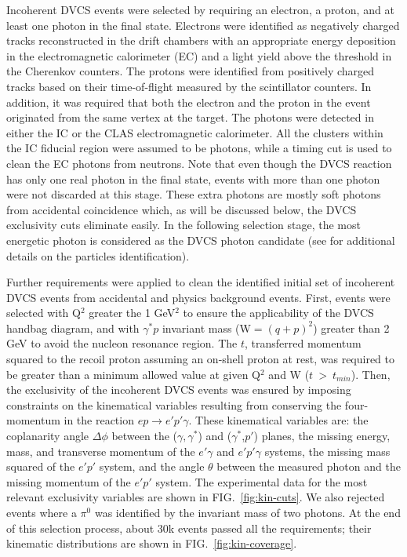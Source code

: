 \documentclass[twocolumn,nofootinbib,showpacs,prl,superscriptaddress,secnumarabic,amssymb,nobibnotes,aps,floatfix]{revtex4}
\begin{document}
Incoherent DVCS events were selected by requiring an electron, a proton, and at 
least one photon in the final state. Electrons were identified as negatively 
charged tracks reconstructed in the drift chambers with an appropriate energy 
deposition in the electromagnetic calorimeter (EC) and a light yield above the 
threshold in the Cherenkov counters. The protons were identified from 
positively charged tracks based on their time-of-flight measured 
by the scintillator counters.  In addition, it was required that both the 
electron and the proton in the event originated from the same vertex at the 
target. The photons were detected in 
either the IC or the CLAS electromagnetic calorimeter. All the clusters within 
the IC fiducial region were assumed to be photons, while a timing cut is used 
to clean the EC photons from neutrons. Note that even though the DVCS reaction 
has only one real photon in the final state, events with more than one photon 
were not discarded at this stage. These extra photons are mostly soft photons from accidental 
coincidence which, as will be discussed below, the DVCS exclusivity cuts 
eliminate easily. In the following selection stage, the most energetic photon 
is considered as the DVCS photon candidate (see \cite{Hattawy:thesis} for 
additional details on the particles identification).  

Further requirements were applied to clean the identified initial set of 
incoherent DVCS events from accidental and physics background events. First, 
events were selected with Q$^{2}$ greater the 1 GeV$^2$ to ensure the 
applicability of the DVCS handbag diagram, and with $\gamma^{*}p$ invariant 
mass (W$=(q+p)^2$) greater than 2 GeV to avoid the nucleon resonance region.  
The $t$, transferred momentum squared to the recoil proton assuming an 
on-shell proton at rest, was required to be greater than a minimum allowed 
value at given Q$^2$ and W ($t~>~t_{min}$).  Then, the exclusivity of the 
incoherent DVCS events was ensured by imposing constraints on the kinematical 
variables resulting from conserving the four-momentum in the reaction 
$ep\rightarrow e'p'\gamma$. These kinematical variables are: the coplanarity 
angle $\Delta\phi$ between the ($\gamma,\gamma^*$) and ($\gamma^*$,$p'$) 
planes, the missing energy, mass, and transverse momentum of the $e'\gamma$ and 
$e'p'\gamma$ systems, the missing mass squared of the $e'p'$ system, and the 
angle $\theta$ between the measured photon and the missing momentum of the 
$e'p'$ system. The experimental data for the most relevant exclusivity 
variables are shown in FIG.~\ref{fig:kin-cuts}. We also rejected events where a 
$\pi^0$ was identified by the invariant mass of two photons. At the end of
this selection process, about 30k events 
passed all the requirements; their kinematic distributions are shown in 
FIG.~\ref{fig:kin-coverage}.  
\end{document}
